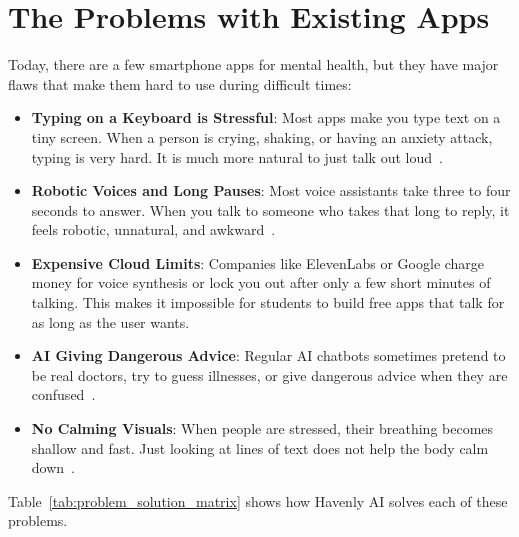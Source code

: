 \section{The Problems with Existing Apps}
\label{sec:intro_problem_statement}

Today, there are a few smartphone apps for mental health, but they have major flaws that make them hard to use during difficult times:

\begin{itemize}
    \item \textbf{Typing on a Keyboard is Stressful}: Most apps make you type text on a tiny screen. When a person is crying, shaking, or having an anxiety attack, typing is very hard. It is much more natural to just talk out loud~\cite{fitzpatrick2017delivering}.
    \item \textbf{Robotic Voices and Long Pauses}: Most voice assistants take three to four seconds to answer. When you talk to someone who takes that long to reply, it feels robotic, unnatural, and awkward~\cite{geminiteam2024gemini15}.
    \item \textbf{Expensive Cloud Limits}: Companies like ElevenLabs or Google charge money for voice synthesis or lock you out after only a few short minutes of talking. This makes it impossible for students to build free apps that talk for as long as the user wants.
    \item \textbf{AI Giving Dangerous Advice}: Regular AI chatbots sometimes pretend to be real doctors, try to guess illnesses, or give dangerous advice when they are confused~\cite{miner2016smartphone}.
    \item \textbf{No Calming Visuals}: When people are stressed, their breathing becomes shallow and fast. Just looking at lines of text does not help the body calm down~\cite{porges2011polyvagal}.
\end{itemize}

Table~\ref{tab:problem_solution_matrix} shows how Havenly AI solves each of these problems.

